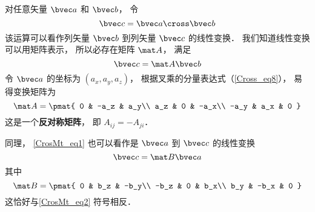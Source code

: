 
对任意矢量 $\bvec a$ 和 $\bvec b$， 令
\begin{equation}\label{CrosMt_eq1}
\bvec c = \bvec a \cross \bvec b
\end{equation}
该运算可以看作列矢量 $\bvec b$ 到列矢量 $\bvec c$ 的线性变换． 我们知道线性变换可以用矩阵表示， 所以必存在矩阵 $\mat A$， 满足
\begin{equation}\label{CrosMt_eq3}
\bvec c = \mat A \bvec b
\end{equation}
令 $\bvec a$ 的坐标为 $(a_x, a_y, a_z)$， 根据叉乘的分量表达式（\autoref{Cross_eq8}）， 易得变换矩阵为
\begin{equation}\label{CrosMt_eq2}
\mat A = \pmat{
0 & -a_z & a_y\\
a_z & 0 & -a_x\\
-a_y & a_x & 0
}
\end{equation}
这是一个\textbf{反对称矩阵}， 即 $A_{ij} = -A_{ji}$．

同理， \autoref{CrosMt_eq1} 也可以看作是 $\bvec a$ 到 $\bvec c$ 的线性变换
\begin{equation}
\bvec c = \mat B \bvec a
\end{equation}
其中
\begin{equation}
\mat B = \pmat{
0 & b_z & -b_y\\
-b_z & 0 & b_x\\
b_y & -b_x & 0
}
\end{equation}
这恰好与\autoref{CrosMt_eq2} 符号相反．
